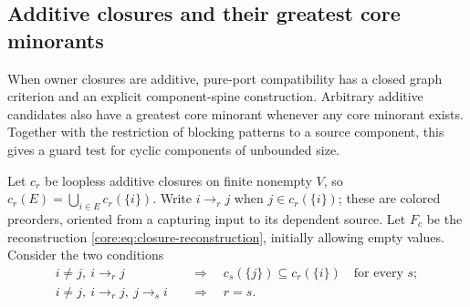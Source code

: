 \subsection{Additive closures and their greatest core minorants}
\label{app:core-additive}

When owner closures are additive, pure-port compatibility has a closed
graph criterion and an explicit component-spine construction. Arbitrary
additive candidates also have a greatest core minorant whenever any
core minorant exists. Together with the restriction of blocking
patterns to a source component, this gives a guard test for cyclic
components of unbounded size.

Let $c_r$ be loopless additive closures on finite nonempty $V$, so
$c_r(E)=\bigcup_{i\in E}c_r(\{i\})$. Write $i\to_r j$ when
$j\in c_r(\{i\})$; these are colored preorders, oriented from a
capturing input to its dependent source. Let $F_c$ be the reconstruction
\eqref{core:eq:closure-reconstruction}, initially allowing empty values.
Consider the two conditions
\begin{align}
 i\ne j,\ i\to_r j&\quad\Longrightarrow\quad
 c_s(\{j\})\subseteq c_r(\{i\})\quad\text{for every }s;
 \tag{D}\label{core:eq:additive-descent}\\
 i\ne j,\ i\to_r j,\ j\to_s i&\quad\Longrightarrow\quad r=s.
 \tag{R}\label{core:eq:additive-reciprocity}
\end{align}

